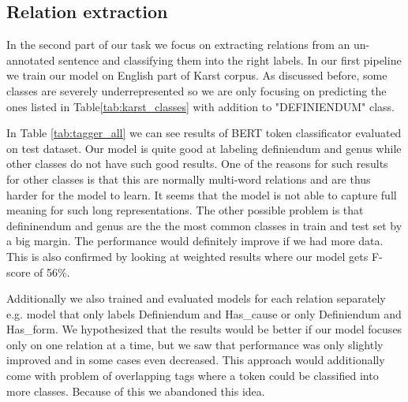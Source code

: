 \documentclass[fleqn,moreauthors,10pt]{ds_report}
\begin{document}



\subsection{Relation extraction}
\par In the second part of our task we focus on extracting relations from an un-annotated sentence and classifying them into the right labels. In our first pipeline we train our model on English part of Karst corpus. As discussed before, some classes are severely underrepresented so we are only focusing on predicting the ones listed in Table\ref{tab:karst_classes} with addition to "DEFINIENDUM" class. 
\par In Table \ref{tab:tagger_all} we can see results of BERT token classificator evaluated on test dataset. Our model is quite good at labeling definiendum and genus while other classes do not have such good results. One of the reasons for such results for other classes is that this are normally multi-word relations and are thus harder for the model to learn. It seems that the model is not able to capture full meaning for such long representations. The other possible problem is that defininendum and genus are the the most common classes in train and test set by a big margin. The performance would definitely improve if we had more data. This is also confirmed by looking at weighted results where our model gets F-score of 56\%.
\par Additionally we also trained and evaluated models for each relation separately e.g. model that only labels Definiendum and Has\_cause or only Definiendum and Has\_form. We hypothesized that the results would be better if our model focuses only on one relation at a time, but we saw that performance was only slightly improved and in some cases even decreased. This approach would additionally come with problem of overlapping tags where a token could be classified into more classes. Because of this we abandoned this idea.
\end{document}
